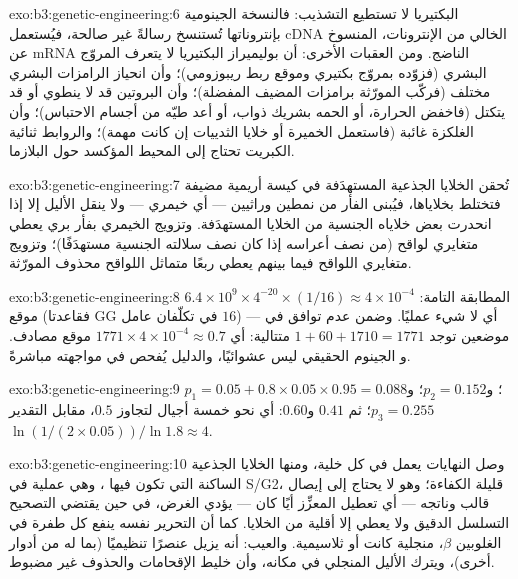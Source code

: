 \begin{solution}{exo:b3:genetic-engineering:6}
البكتيريا لا تستطيع التشذيب: فالنسخة الجينومية بإنتروناتها
تُستنسخ رسالةً غير صالحة، فيُستعمل cDNA الخالي من الإنترونات، المنسوخ
عن mRNA الناضج. ومن العقبات الأخرى: أن بوليميراز البكتيريا لا
يتعرف المروّج البشري (فزوّده بمروّج بكتيري وموقع
ربط ريبوزومي)؛ وأن انحياز الرامزات البشري مختلف (فركّب المورّثة
برامزات المضيف المفضلة)؛ وأن البروتين قد لا ينطوي أو قد
يتكتل (فاخفض الحرارة، أو الحمه بشريك ذواب، أو أعد طيّه
من أجسام الاحتباس)؛ وأن الغلكزة غائبة (فاستعمل الخميرة أو خلايا
الثدييات إن كانت مهمة)؛ والروابط ثنائية الكبريت تحتاج إلى المحيط المؤكسد حول البلازما.
\end{solution}

\begin{solution}{exo:b3:genetic-engineering:7}
تُحقن الخلايا الجذعية المستهدَفة في كيسة أريمية مضيفة فتختلط
بخلاياها، فيُبنى الفأر من نمطين وراثيين --- أي
خيمري --- ولا ينقل الأليل إلا إذا انحدرت بعض خلاياه الجنسية من
الخلايا المستهدَفة. وتزويج الخيمري بفأر
بري يعطي متغايري لواقح (من نصف أعراسه إذا كان نصف
سلالته الجنسية مستهدَفًا)؛ وتزويج متغايري اللواقح فيما بينهم يعطي ربعًا
متماثل اللواقح محذوف المورّثة.
\end{solution}

\begin{solution}{exo:b3:genetic-engineering:8}
المطابقة التامة: $6.4\times 10^{9}\times 4^{-20}\times (1/16) \approx 4\times
10^{-4}$ موقع (فقاعدتا GG في  تكلّفان عامل $16$) --- أي لا شيء
عمليًا. وضمن عدم توافق في موضعين توجد $1 + 60 + 1710 = 1771$
متتالية: أي $1771\times 4\times 10^{-4} \approx 0.7$ موقع مصادف. و
الجينوم الحقيقي ليس عشوائيًا، والدليل يُفحص في مواجهته مباشرةً.
\end{solution}

\begin{solution}{exo:b3:genetic-engineering:9}
$p_{1} = 0.05 + 0.8\times 0.05\times 0.95 = 0.088$؛ و$p_{2} = 0.152$؛
و$p_{3} = 0.255$؛ ثم $0.41$ و$0.60$: أي نحو خمسة أجيال لتجاوز
$0.5$، مقابل التقدير $\ln(1/(2\times 0.05))/\ln 1.8 \approx 4$.
\end{solution}

\begin{solution}{exo:b3:genetic-engineering:10}
وصل النهايات يعمل في كل خلية، ومنها الخلايا الجذعية الساكنة التي
تكون فيها ، وهي عملية في S/G2، قليلة الكفاءة؛ وهو
لا يحتاج إلى إيصال قالب وناتجه --- أي تعطيل
المعزِّز أيًا كان --- يؤدي الغرض، في حين يقتضي التصحيح التسلسل
الدقيق ولا يعطي إلا أقلية من الخلايا. كما أن التحرير نفسه ينفع
كل طفرة في الغلوبين $\beta$، منجلية كانت أو ثلاسيمية. والعيب: أنه
يزيل عنصرًا تنظيميًا (بما له من أدوار أخرى)، ويترك
الأليل المنجلي في مكانه، وأن خليط الإقحامات والحذوف غير مضبوط.
\end{solution}

